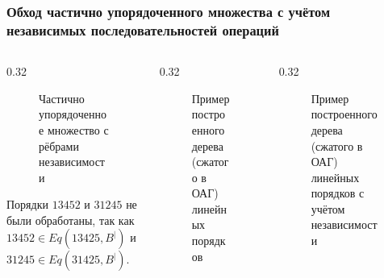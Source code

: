 \begin{frame}
  \frametitle{Обход частично упорядоченного множества с учётом
  независимых последовательностей операций}

  \begin{columns}[T, onlytextwidth]
    \begin{column}{0.32\textwidth}

      \begin{figure}
        \scalebox{0.6}{}
        \caption{Частично упорядоченное множество с рёбрами независимости}
        \label{fig:topo-indep-poset}
      \end{figure}

      Порядки $13452$ и $31245$ не были обработаны, так как
      $13452 \in Eq(13425, B^|)$ и $31245 \in Eq(31425, B^|)$.

    \end{column}

    \begin{column}{0.32\textwidth}

      \begin{figure}
        \scalebox{0.6}{}
        \caption{Пример построенного дерева (сжатого в ОАГ) линейных порядков}
        \label{fig:topo-trav-tree}
      \end{figure}
    \end{column}

    \begin{column}{0.32\textwidth}

      \begin{figure}
        \scalebox{0.6}{}
        \caption{Пример построенного дерева (сжатого в ОАГ) линейных
        порядков с учётом независимости}
        \label{fig:topo-trav-indep-tree}
      \end{figure}
    \end{column}
  \end{columns}

\end{frame}

